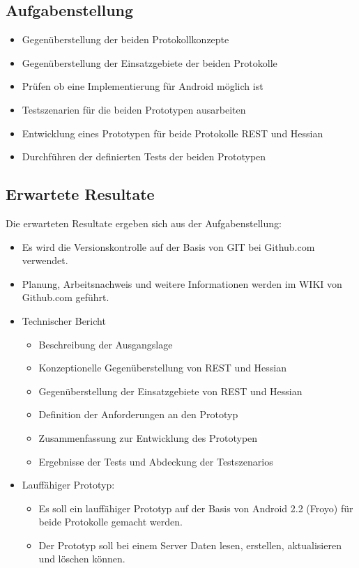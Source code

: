 \documentclass[listof=totoc,bibliography=totoc]{scrreprt}
\begin{document}
  \newpage
  
  \subsection{Aufgabenstellung}
  
  \begin{itemize}
      \item Gegenüberstellung der beiden Protokollkonzepte
      \item Gegenüberstellung der Einsatzgebiete der beiden Protokolle
      \item Prüfen ob eine Implementierung für Android möglich ist
      \item Testszenarien für die beiden Prototypen ausarbeiten
      \item Entwicklung eines Prototypen für beide Protokolle REST und
          Hessian
      \item Durchführen der definierten Tests der beiden Prototypen
  \end{itemize}
  
  \subsection{Erwartete Resultate}
  Die erwarteten Resultate ergeben sich aus der Aufgabenstellung:
  
  \begin{itemize}    
      \item Es wird die Versionskontrolle auf der Basis von GIT bei
          Github.com verwendet.
      \item Planung, Arbeitsnachweis und weitere Informationen werden im WIKI
          von Github.com geführt.
      \item Technischer Bericht
      \begin{itemize}
          \item Beschreibung der Ausgangslage
          \item Konzeptionelle Gegenüberstellung von REST und Hessian
          \item Gegenüberstellung der Einsatzgebiete von REST und Hessian
          \item Definition der Anforderungen an den Prototyp 
          \item Zusammenfassung zur Entwicklung des Prototypen
          \item Ergebnisse der Tests und Abdeckung der Testszenarios
          
      \end{itemize}
      \item Lauffähiger Prototyp:
      \begin{itemize}
          \item Es soll ein lauffähiger Prototyp auf der Basis von
              Android 2.2 (Froyo) für beide Protokolle gemacht werden.
           \item Der Prototyp soll bei einem Server Daten lesen, erstellen,
              aktualisieren und löschen können.
      \end{itemize}
  \end{itemize}
  
\end{document}
